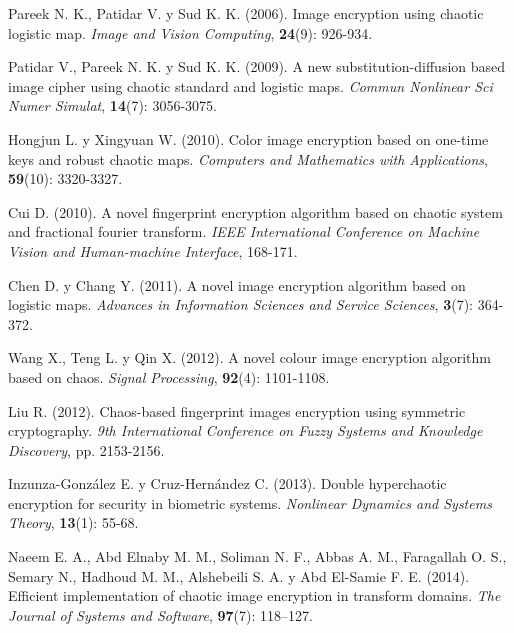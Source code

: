 \begin{thebibliography}{00}
Pareek N. K., Patidar V. y Sud K. K. (2006).
\newblock Image encryption using chaotic logistic map.
\newblock \emph{Image and Vision Computing}, \textbf{24}(9): 926-934.

Patidar V., Pareek N. K. y Sud K. K. (2009).
\newblock A new substitution-diffusion based image cipher using chaotic standard and logistic maps.
\newblock \emph{Commun Nonlinear Sci Numer Simulat}, \textbf{14}(7): 3056-3075.

Hongjun L. y Xingyuan W. (2010).
\newblock Color image encryption based on one-time keys and robust chaotic maps.
\newblock \emph{Computers and Mathematics with Applications}, \textbf{59}(10): 3320-3327.

Cui D. (2010).
\newblock A novel fingerprint encryption algorithm based on chaotic system and fractional fourier transform.
\newblock \emph{IEEE International Conference on Machine Vision and Human-machine Interface}, 168-171.

Chen D. y Chang Y. (2011).
\newblock A novel image encryption algorithm based on logistic maps.
\newblock \emph{Advances in Information Sciences and Service Sciences}, \textbf{3}(7): 364-372.

Wang X., Teng L. y Qin X. (2012).
\newblock A novel colour image encryption algorithm based on chaos.
\newblock \emph{Signal Processing}, \textbf{92}(4): 1101-1108.

Liu R. (2012).
\newblock Chaos-based fingerprint images encryption using symmetric cryptography.
\newblock \emph{9th International Conference on Fuzzy Systems and Knowledge Discovery}, pp. 2153-2156.

Inzunza-Gonz\'alez E. y Cruz-Hern\'andez C. (2013).
\newblock Double hyperchaotic encryption for security in biometric systems.
\newblock \emph{Nonlinear Dynamics and Systems Theory}, \textbf{13}(1): 55-68.

Naeem E. A., Abd Elnaby M. M., Soliman N. F., Abbas A. M., Faragallah O. S., Semary N., Hadhoud M. M.,  Alshebeili S. A. y Abd El-Samie F. E. (2014).
\newblock Efficient implementation of chaotic image encryption in transform domains.
\newblock \emph{The Journal of Systems and Software}, \textbf{97}(7): 118–127.


\end{thebibliography}
